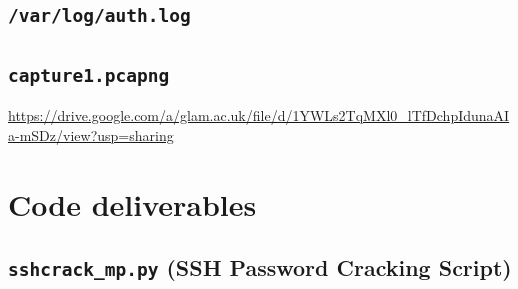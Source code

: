 \documentclass[12pt]{report}
\begin{document}
\section{\texttt{/var/log/auth.log}}
\label{app:files:authlog}


\section{\texttt{capture1.pcapng}}
\label{app:links:capture_pcapng}
\url{https://drive.google.com/a/glam.ac.uk/file/d/1YWLs2TqMXl0\_lTfDchpIdunaAIa-mSDz/view?usp=sharing}

\pagebreak
\chapter{Code deliverables}
\section{\texttt{sshcrack\_mp.py} (SSH Password Cracking Script)}
\label{app:code:sshcrack_mp}

\end{document}
